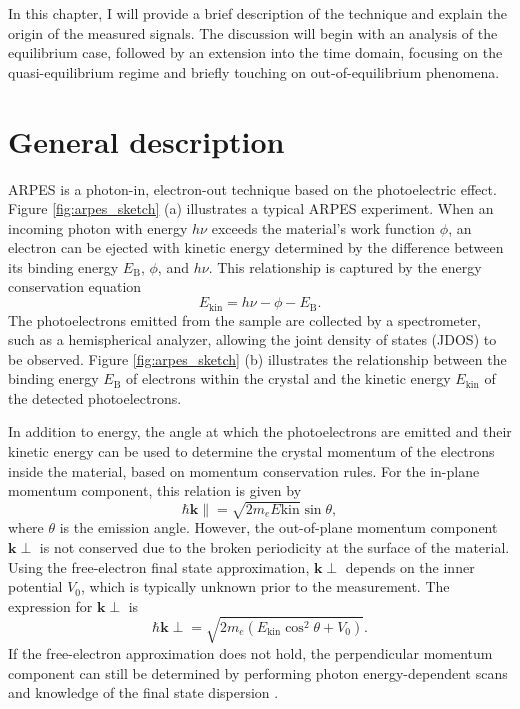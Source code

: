 In this chapter, I will provide a brief description of the technique and explain the origin of the measured signals.
The discussion will begin with an analysis of the equilibrium case, followed by an extension into the time domain, focusing on the quasi-equilibrium regime and briefly touching on out-of-equilibrium phenomena.

\section{General description}

ARPES is a photon-in, electron-out technique based on the photoelectric effect.
Figure \ref{fig:arpes_sketch} (a) illustrates a typical ARPES experiment.
When an incoming photon with energy $h\nu$ exceeds the material's work function $\phi$, an electron can be ejected with kinetic energy determined by the difference between its binding energy $E_\text{B}$, $\phi$, and $h\nu$.
This relationship is captured by the energy conservation equation
\begin{equation}
	E_\text{kin} = h\nu - \phi - E_\text{B}.
	\label{eq:e_cons}
\end{equation}
The photoelectrons emitted from the sample are collected by a spectrometer, such as a hemispherical analyzer, allowing the joint density of states (JDOS) to be observed.
Figure \ref{fig:arpes_sketch} (b) illustrates the relationship between the binding energy $E_\text{B}$ of electrons within the crystal and the kinetic energy $E_\text{kin}$ of the detected photoelectrons.

In addition to energy, the angle at which the photoelectrons are emitted and their kinetic energy can be used to determine the crystal momentum of the electrons inside the material, based on momentum conservation rules.
For the in-plane momentum component, this relation is given by
\begin{equation}
	\hbar \mathbf{k}\parallel = \sqrt{2m_eE\text{kin}} \sin\theta,
	\label{eq:mom}
\end{equation}
where $\theta$ is the emission angle.
However, the out-of-plane momentum component $\mathbf{k}\perp$ is not conserved due to the broken periodicity at the surface of the material.
Using the free-electron final state approximation, $\mathbf{k}\perp$ depends on the inner potential $V_0$, which is typically unknown prior to the measurement.
The expression for $\mathbf{k}\perp$ is
\begin{equation}
	\hbar \mathbf{k}\perp = \sqrt{2m_e\left(E_\text{kin}\cos^2\theta+V_0\right)}.
\end{equation}
If the free-electron approximation does not hold, the perpendicular momentum component can still be determined by performing photon energy-dependent scans and knowledge of the final state dispersion \cite{strocov_intrinsic_2003}.

